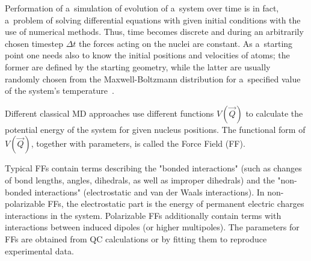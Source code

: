 Performation of a~simulation of evolution of a~system over time is in fact, a~problem of solving differential equations with given initial conditions with the use of numerical methods. Thus, time becomes discrete and during an arbitrarily chosen timestep $\Delta t$ the forces acting on the nuclei are constant. As a~starting point one needs also to know the initial positions and velocities of atoms; the former are defined by the starting geometry, while the latter are usually randomly chosen from the Maxwell-Boltzmann distribution for a~specified value of the system's temperature~\cite{jensen}.

Different classical MD approaches use different functions $V(\Vec{Q})$ to calculate the potential energy of the system for given nucleus positions. The functional form of $V(\Vec{Q})$, together with parameters, is called the Force Field (FF).

Typical FFs contain terms describing the "bonded interactions" (such as changes of bond lengths, angles, dihedrals, as well as improper dihedrals) and the "non-bonded interactions" (electrostatic and van der Waals interactions). In non-polarizable FFs, the electrostatic part is the energy of permanent electric charges interactions in the system. Polarizable FFs additionally contain terms with interactions between induced dipoles (or higher multipoles). The parameters for FFs are obtained from QC calculations or by fitting them to reproduce experimental data.


